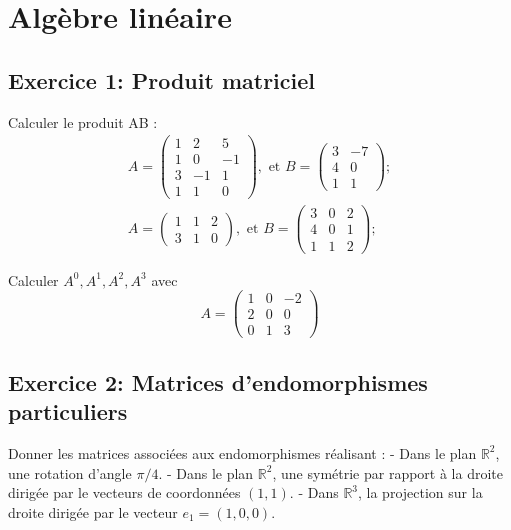 \chapter{Algèbre linéaire}


\section*{Exercice 1: Produit matriciel}

Calculer le produit AB :
\[
\begin{gathered}
A=\left(\begin{array}{ccc}
1 & 2 & 5 \\
1 & 0 & -1 \\
3 & -1 & 1 \\
1 & 1 & 0
\end{array}\right), \text { et } B=\left(\begin{array}{cc}
3 & -7 \\
4 & 0 \\
1 & 1
\end{array}\right) ; \\
A=\left(\begin{array}{lll}
1 & 1 & 2 \\
3 & 1 & 0
\end{array}\right), \text { et } B=\left(\begin{array}{lll}
3 & 0 & 2 \\
4 & 0 & 1 \\
1 & 1 & 2
\end{array}\right) ;
\end{gathered}
\]

Calculer \(A^{0}, A^{1}, A^{2}, A^{3}\) avec
\[
A=\left(\begin{array}{ccc}
1 & 0 & -2 \\
2 & 0 & 0 \\
0 & 1 & 3
\end{array}\right)
\]

\section*{Exercice 2: Matrices d'endomorphismes particuliers}

Donner les matrices associées aux endomorphismes réalisant :
- Dans le plan \(\mathbb{R}^{2}\), une rotation d'angle \(\pi / 4\).
- Dans le plan \(\mathbb{R}^{2}\), une symétrie par rapport à la droite dirigée par le vecteurs de coordonnées \((1,1)\).
- Dans \(\mathbb{R}^{3}\), la projection sur la droite dirigée par le vecteur \(e_{1}=(1,0,0)\).

